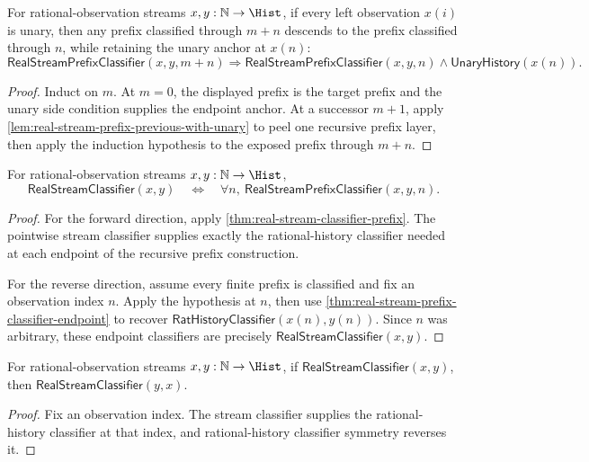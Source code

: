 \begin{theorem}
\label{thm:real-stream-prefix-add-left-previous-with-unary}
For rational-observation streams $x,y:\mathbb{N}\to\Hist$, if every left observation $x(i)$ is unary, then any prefix classified through $m+n$ descends to the prefix classified through $n$, while retaining the unary anchor at $x(n)$:
$$
\mathsf{RealStreamPrefixClassifier}(x,y,m+n)
\Longrightarrow
\mathsf{RealStreamPrefixClassifier}(x,y,n)\wedge \mathsf{UnaryHistory}(x(n)).
$$
\end{theorem}
\begin{proof}
Induct on $m$. At $m=0$, the displayed prefix is the target prefix and the unary side condition supplies the endpoint anchor. At a successor $m+1$, apply \autoref{lem:real-stream-prefix-previous-with-unary} to peel one recursive prefix layer, then apply the induction hypothesis to the exposed prefix through $m+n$.
\end{proof}

\begin{theorem}
\label{thm:real-stream-finite-prefix-exactness}
For rational-observation streams $x,y:\mathbb{N}\to\Hist$,
$$
\mathsf{RealStreamClassifier}(x,y)
\quad\Longleftrightarrow\quad
\forall n,\ \mathsf{RealStreamPrefixClassifier}(x,y,n).
$$
\end{theorem}
\begin{proof}
For the forward direction, apply
\autoref{thm:real-stream-classifier-prefix}. The pointwise stream classifier
supplies exactly the rational-history classifier needed at each endpoint of the
recursive prefix construction.

For the reverse direction, assume every finite prefix is classified and fix an
observation index $n$. Apply the hypothesis at $n$, then use
\autoref{thm:real-stream-prefix-classifier-endpoint} to recover
$\mathsf{RatHistoryClassifier}(x(n),y(n))$. Since $n$ was arbitrary, these
endpoint classifiers are precisely $\mathsf{RealStreamClassifier}(x,y)$.
\end{proof}

\begin{theorem}
\label{thm:real-stream-classifier-symmetry}
For rational-observation streams $x,y:\mathbb{N}\to\Hist$, if
$\mathsf{RealStreamClassifier}(x,y)$, then
$\mathsf{RealStreamClassifier}(y,x)$.
\end{theorem}
\begin{proof}
Fix an observation index. The stream classifier supplies the rational-history
classifier at that index, and rational-history classifier symmetry reverses it.
\end{proof}

